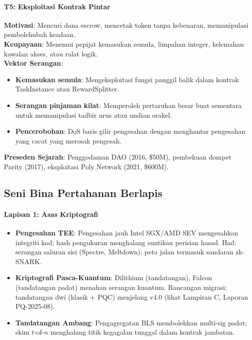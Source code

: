 \documentclass[11pt]{article}
\begin{document}
\paragraph{T5: Eksploitasi Kontrak Pintar}
\textbf{Motivasi}: Mencuri dana escrow, mencetak token tanpa kebenaran, memanipulasi pembolehubah keadaan.\\
\textbf{Keupayaan}: Menemui pepijat kemasukan semula, limpahan integer, kelemahan kawalan akses, atau ralat logik.\\
\textbf{Vektor Serangan}:
\begin{itemize}[noitemsep]
  \item \textbf{Kemasukan semula}: Mengeksploitasi fungsi panggil balik dalam kontrak TaskInstance atau RewardSplitter.
  \item \textbf{Serangan pinjaman kilat}: Memperoleh pertaruhan besar buat sementara untuk memanipulasi tadbir urus atau undian orakel.
  \item \textbf{Pencerobohan}: DoS baris gilir pengesahan dengan menghantar pengesahan yang cacat yang merosak pengesah.
\end{itemize}
\textbf{Preseden Sejarah}: Penggodaman DAO (2016, \$50M), pembekuan dompet Parity (2017), eksploitasi Poly Network (2021, \$600M).

\subsection{Seni Bina Pertahanan Berlapis}

\paragraph{Lapisan 1: Asas Kriptografi}
\begin{itemize}[noitemsep]
  \item \textbf{Pengesahan TEE}: Pengesahan jauh Intel SGX/AMD SEV mengesahkan integriti kod; hash pengukuran menghalang suntikan perisian hasad. Had: serangan saluran sisi (Spectre, Meltdown); peta jalan termasuk sandaran zk-SNARK.
  \item \textbf{Kriptografi Pasca-Kuantum}: Dilithium (tandatangan), Falcon (tandatangan padat) menahan serangan kuantum. Rancangan migrasi: tandatangan dwi (klasik + PQC) menjelang v4.0 (lihat Lampiran C, Laporan PQ-2025-08).
  \item \textbf{Tandatangan Ambang}: Pengagregatan BLS membolehkan multi-sig padat; skim $t$-of-$n$ menghalang titik kegagalan tunggal dalam kontrak jambatan.
\end{itemize}
\end{document}
